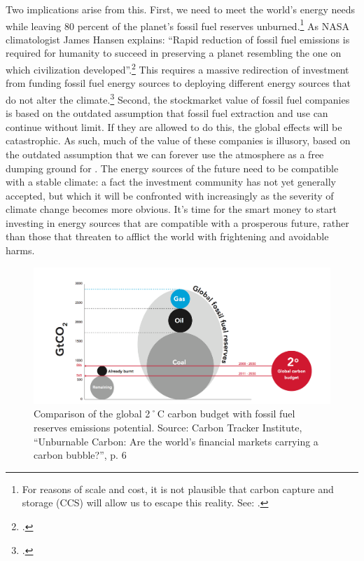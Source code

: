 \documentclass[10pt]{article}
\begin{document}
Two implications arise from this. 
First, we need to meet the world's energy needs while leaving 80 percent of the planet's fossil fuel reserves unburned.\footnote{For reasons of scale and cost, it is not plausible that carbon capture and storage (CCS) will allow us to escape this reality. See: .} 
As NASA climatologist James Hansen explains: ``Rapid reduction of fossil fuel emissions is required for humanity to
succeed in preserving a planet resembling the one on which civilization developed''.\footcite[][]{HansenPaleo}
This requires a massive redirection of investment from funding fossil fuel energy sources to deploying different energy sources that do not alter the climate.\footcite[See: ][]{SternEuropeanLowCarbon}
Second, the stockmarket value of fossil fuel companies is based on the outdated assumption that fossil fuel extraction and use can continue without limit.
If they are allowed to do this, the global effects will be catastrophic.
As such, much of the value of these companies is illusory, based on the outdated assumption that we can forever use the atmosphere as a free dumping ground for .
The energy sources of the future need to be compatible with a stable climate: a fact the investment community has not yet generally accepted, but which it will be confronted with increasingly as the severity of climate change becomes more obvious.
It's time for the smart money to start investing in energy sources that are compatible with a prosperous future, rather than those that threaten to afflict the world with frightening and avoidable harms.



\begin{figure}
\includegraphics[width=\textwidth]{s1-carbon-budget.png}
\centering
\caption{Comparison of the global 2˚C carbon budget with fossil fuel reserves  emissions potential. Source: Carbon Tracker Institute, ``Unburnable Carbon: Are the world's financial markets carrying a carbon bubble?'', p. 6}
\label{fig:TwoDegreeBudget}
\end{figure}
\end{document}
